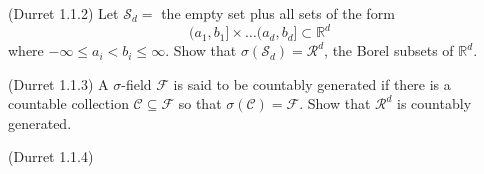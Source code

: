 \documentclass[12pt]{gradescopeexam}
\renewcommand\P{\mathbb{P}}
\newcommand\R{\mathbb{R}}
\newcommand\cF{\mathcal{F}}     %
\newcommand\cS{\mathcal{S}}     %
\newcommand\cR{\mathcal{R}}     %
\newcommand\cC{\mathcal{C}}     %
\begin{document}
\begin{questions}
\begin{question}
  \end{question}
  \begin{question}
    (Durret 1.1.2)
    Let $\cS_d=$ the empty set plus all
    sets of the form
    $$(a_1,b_1]\times\ldots(a_d,b_d]\subset \R^d$$
    where $-\infty \le a_i < b_i\le\infty$.
    Show that $\sigma(\cS_d) = \cR^d$, the Borel subsets of $\R^d$.
    \begin{prooforbox}[7in]
    \end{prooforbox}
  \end{question}
  \begin{question}
    (Durret 1.1.3)
    A $\sigma$-field $\cF$ is said to be countably generated if there is a
    countable collection $\cC \subseteq \cF$ so that $\sigma(\cC) = \cF$. Show that $\cR^d$
    is countably  generated.
    \begin{prooforbox}[7.5in]
    \end{prooforbox}
  \end{question}
  \begin{question}
    (Durret 1.1.4)
    \begin{parts}

\end{parts}
\end{question}
\end{questions}
\end{document}
